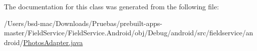 The documentation for this class was generated from the following file\+:\begin{DoxyCompactItemize}
\item 
/\+Users/bsd-\/mac/\+Downloads/\+Pruebas/prebuilt-\/apps-\/master/\+Field\+Service/\+Field\+Service.\+Android/obj/\+Debug/android/src/fieldservice/android/\hyperlink{_photos_adapter_8java}{Photos\+Adapter.\+java}\end{DoxyCompactItemize}
